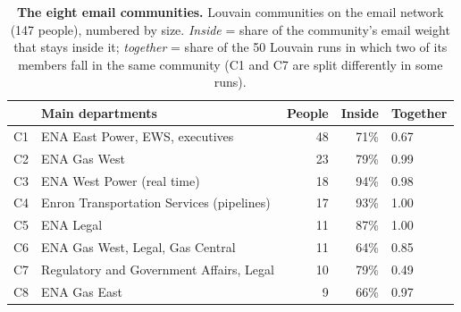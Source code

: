 \begin{table}[h]
\centering
\caption{\textbf{The eight email communities.} Louvain communities on the email network
(147 people), numbered by size. \emph{Inside} = share of the community's email weight that
stays inside it; \emph{together} = share of the 50 Louvain runs in which two of its members
fall in the same community (C1 and C7 are split differently in some runs).}
\label{tab:communities}
\small
\begin{tabular}{llrrl}
\hline
 & Main departments & People & Inside & Together \\
\hline
C1 & ENA East Power, EWS, executives & 48 & 71\% & 0.67 \\
C2 & ENA Gas West & 23 & 79\% & 0.99 \\
C3 & ENA West Power (real time) & 18 & 94\% & 0.98 \\
C4 & Enron Transportation Services (pipelines) & 17 & 93\% & 1.00 \\
C5 & ENA Legal & 11 & 87\% & 1.00 \\
C6 & ENA Gas West, Legal, Gas Central & 11 & 64\% & 0.85 \\
C7 & Regulatory and Government Affairs, Legal & 10 & 79\% & 0.49 \\
C8 & ENA Gas East & 9 & 66\% & 0.97 \\
\hline
\end{tabular}
\end{table}
